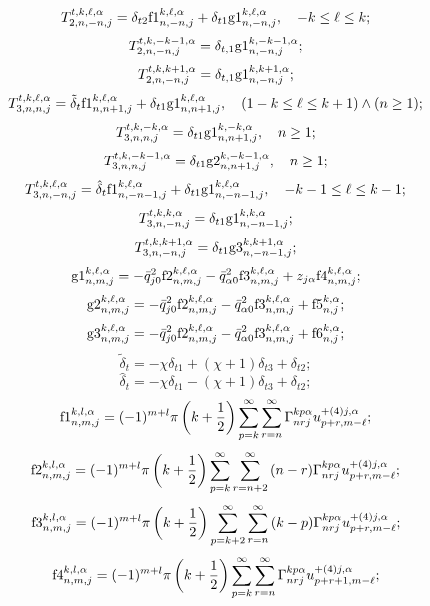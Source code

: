 \begin{russian}
\begin{theorem}
\[T_{2,n, - n,j}^{t,k,\ell ,\alpha } = {\delta _{t2}}{\rm{f1}}_{n, - n,j}^{k,\ell ,\alpha } + {\delta _{t1}}{\rm g1}_{n, - n,j}^{k,\ell ,\alpha },\quad - k \le \ell  \le k;\]
\[T_{2,n, - n,j}^{t,k,-k-1,\alpha } =  {\delta _{t,1}}{\rm g1}_{n, - n,j}^{k,-k-1,\alpha };\]
\[T_{2,n, - n,j}^{t,k,k + 1,\alpha } =  {\delta _{t,1}}{\rm g1}_{n, - n,j}^{k,k + 1,\alpha };\]
\[T_{3,n,n,j}^{t,k,\ell ,\alpha } = {\tilde \delta _t}{\rm{f1}}_{n,n + 1,j}^{k,\ell ,\alpha } + {\delta _{t1}}{\rm g1}_{n,n + 1,j}^{k,\ell ,\alpha },\quad (1 - k \le \ell  \le k + 1) \wedge (n \ge 1);\]
\[T_{3,n,n,j}^{t,k, - k,\alpha } = {\delta _{t1}}{\rm g1}_{n,n + 1,j}^{k, - k,\alpha },\quad n\ge 1;\]
\[T_{3,n,n,j}^{t,k, - k - 1,\alpha } = {\delta _{t1}}{\rm g2}_{n,n + 1,j}^{k, - k - 1,\alpha },\quad n\ge 1;\]
\[T_{3,n, - n,j}^{t,k,\ell ,\alpha } = {\hat \delta _t}{\rm{f1}}_{n, - n - 1,j}^{k,\ell ,\alpha } + {\delta _{t1}}{\rm g1}_{n, - n - 1,j}^{k,\ell ,\alpha },\quad - k - 1 \le \ell  \le k - 1;\]
\[T_{3,n, - n,j}^{t,k,k,\alpha } = {\delta _{t1}}{\rm g1}_{n, - n - 1,j}^{k,k,\alpha };\]
\[T_{3,n, - n,j}^{t,k,k + 1,\alpha } = {\delta _{t1}}{\rm g3}_{n, - n - 1,j}^{k,k + 1,\alpha };\]
\[{\rm g1}_{n,m,j}^{k,\ell ,\alpha } = -{{\bar q}}_{j0}^2{\rm{f2}}_{n,m,j}^{k,\ell ,\alpha } - {{\bar q}}_{\alpha 0}^2{\rm{f3}}_{n,m,j}^{k,\ell ,\alpha } + {{{z}}_{{{j}}\alpha }}{\rm{f4}}_{n,m,j}^{k,\ell ,\alpha };\]
\[{\rm g2}_{n,m,j}^{k,\ell ,\alpha } = -{{\bar q}}_{j0}^2{\rm{f2}}_{n,m,j}^{k,\ell ,\alpha } - {{\bar q}}_{\alpha 0}^2{\rm{f3}}_{n,m,j}^{k,\ell ,\alpha } + {\rm{f5}}_{n,j}^{k,\alpha };\]
\[{\rm g3}_{n,m,j}^{k,\ell ,\alpha } = -{{\bar q}}_{j0}^2{\rm{f2}}_{n,m,j}^{k,\ell ,\alpha } - {{\bar q}}_{\alpha 0}^2{\rm{f3}}_{n,m,j}^{k,\ell ,\alpha } + {\rm{f6}}_{n,j}^{k,\alpha };\]
\[{\tilde \delta _t} =  - \chi {\delta _{t1}} + (\chi  + 1){\delta _{t3}} + {\delta _{t2}};\]
\[{\hat \delta _t} =  - \chi {\delta _{t1}} - (\chi  + 1){\delta _{t3}} + {\delta _{t2}};\]
\[{\rm{f1}}_{n,m,j}^{k,l,\alpha } = (-1)^{m+l}\pi \left( {k + \frac{1}{2}} \right)\sum\limits_{p = k}^\infty  {\sum\limits_{r = n}^\infty  {\Gamma _{nrj}^{kp\alpha }{u}_{p + r,m - \ell }^{ + (4)j,\alpha }} };\]
\[{\rm{f2}}_{n,m,j}^{k,l,\alpha } = (-1)^{m+l}\pi \left( {k + \frac{1}{2}} \right)\sum\limits_{p = k}^\infty  {\sum\limits_{r = n + 2}^\infty  {(n - r)\Gamma _{nrj}^{kp\alpha }{u}_{p + r,m - \ell }^{ + (4)j,\alpha }} };\]
\[{\rm{f3}}_{n,m,j}^{k,l,\alpha } = (-1)^{m+l}\pi \left( {k + \frac{1}{2}} \right)\sum\limits_{p = k + 2}^\infty  {\sum\limits_{r = n}^\infty  {(k - p)\Gamma _{nrj}^{kp\alpha }{u}_{p + r,m - \ell }^{ + (4)j,\alpha }} };\]
\[{\rm{f4}}_{n,m,j}^{k,l,\alpha } = (-1)^{m+l}\pi \left( {k + \frac{1}{2}} \right)\sum\limits_{p = k}^\infty  {\sum\limits_{r = n}^\infty  {\Gamma _{nrj}^{kp\alpha }{u}_{p + r + 1,m - \ell }^{ + (4)j,\alpha }} };\]

\end{theorem}
\end{russian}

